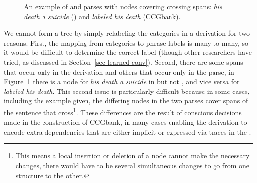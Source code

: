 \begin{figure}

\caption[An example of \ccg and \ptb parses with nodes covering crossing spans.]{ \label{fig:ccg-example}
  An example of \ccg and \ptb parses with nodes covering crossing spans: \emph{his death a suicide} (\ptb) and \emph{labeled his death} (CCGbank).
}
\end{figure}

We cannot form a \ptb tree by simply relabeling the categories in a \ccg derivation for two reasons.
First, the mapping from categories to phrase labels is many-to-many, so it would be difficult to determine the correct label (though other researchers have tried, as discussed in Section~\ref{sec-learned-conv}).
Second, there are some spans that occur only in the \ccg derivation and others that occur only in the \ptb parse, \myeg in Figure~\ref{fig:ccg-example} there is a node for \emph{his death a suicide} in \ptb but not \ccg, and vice versa for \emph{labeled his death}.
This second issue is particularly difficult because in some cases, including the example given, the differing nodes in the two parses cover spans of the sentence that cross\footnote{This means a local insertion or deletion of a node cannot make the necessary changes, there would have to be several simultaneous changes to go from one structure to the other.}.
These differences are the result of conscious decisions made in the construction of CCGbank, in many cases enabling the derivation to encode extra dependencies that are either implicit or expressed via traces in the \ptb.

